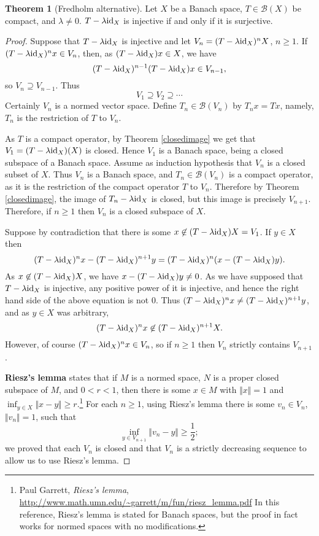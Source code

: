 \documentclass{article}
\newcommand{\id}{\ensuremath\mathrm{id}}
\newcommand{\norm}[1]{\Vert #1 \Vert}
\theoremstyle{definition}
\newtheorem{theorem}{Theorem}
\begin{document}
\begin{theorem}[Fredholm alternative]
Let $X$ be a Banach space, $T \in \mathscr{B}(X)$ be compact, and $\lambda \neq 0$. $T- \lambda \id_X$ is injective if and only if it is surjective.
\end{theorem}
\begin{proof}
Suppose that $T-\lambda \id_X$ is injective and let $V_n = (T-\lambda \id_X)^n X$, $n \geq 1$.
If $(T-\lambda \id_X)^n x \in V_n$, then, as $(T-\lambda \id_X)x \in X$, we have
\[
(T-\lambda \id_X)^{n-1}(T-\lambda \id_X)x \in V_{n-1},
\]
so $V_n \supseteq V_{n-1}$. Thus
\[
V_1 \supseteq V_2 \supseteq \cdots
\]
Certainly $V_n$ is a normed vector space. Define $T_n \in \mathscr{B}(V_n)$ by $T_nx =Tx$, namely, $T_n$ is the restriction of $T$ to $V_n$.

As $T$ is a compact operator, by Theorem \ref{closedimage} we get that
$V_1=(T-\lambda \id_X)(X)$ is closed. Hence $V_1$ is a Banach space, being a closed subspace of a Banach space.
Assume as induction hypothesis that $V_n$ is a closed subset of $X$. Thus $V_n$ is a Banach space, and $T_n \in \mathscr{B}(V_n)$ is a compact operator, as it is
the restriction of the compact operator $T$ to $V_n$. Therefore by Theorem \ref{closedimage}, the image of $T_n-\lambda \id_X$ is closed, but this image is precisely
$V_{n+1}$. Therefore, if $n \geq 1$ then $V_n$ is a closed subspace of $X$. 
 
Suppose by contradiction that there is some $x  \not \in (T-\lambda \id_X)X=V_1$.  If $y \in X$ then
\[
(T-\lambda \id_X)^nx - (T-\lambda \id_X)^{n+1}y = (T-\lambda \id_X)^n ( x-(T-\lambda \id_X)y).
\]
As $x \not \in (T-\lambda \id_X)X$, we have $x - (T-\lambda \id_X)y \neq 0$.
As we have supposed that $T-\lambda \id_X$ is injective, any positive power of it is injective, and hence
the right hand side of the above equation is not $0$. Thus 
$(T-\lambda \id_X)^nx \neq (T-\lambda \id_X)^{n+1}y$, and as $y \in X$ was arbitrary,
\[
(T-\lambda \id_X)^n x  \not \in (T-\lambda \id_X)^{n+1}X.
\]
However, of course $(T-\lambda \id_X)^nx \in V_n$, so if $n \geq 1$ then $V_n$ strictly contains
$V_{n+1}$.

\textbf{Riesz's lemma} states that if $M$ is a normed space, $N$ is a proper closed subspace of $M$, and
$0<r<1$, then there is some $x \in M$ with $\norm{x}=1$ and $\inf_{y \in X} \norm{x-y} \geq r$.\footnote{Paul
Garrett, {\em Riesz's lemma},
\url{http://www.math.umn.edu/~garrett/m/fun/riesz_lemma.pdf} In this
reference, Riesz's lemma is stated for Banach spaces, but the proof in fact works for normed spaces with no modifications.
}
For each $n \geq 1$, using Riesz's lemma there is some $v_n \in V_n$, $\norm{v_n}=1$, such that
\[
\inf_{y \in V_{n+1}} \norm{v_n-y} \geq \frac{1}{2};
\]
we proved that each $V_n$ is closed and that  $V_n$ is a strictly decreasing sequence to allow us to use Riesz's lemma.


\end{proof}
\end{document}
